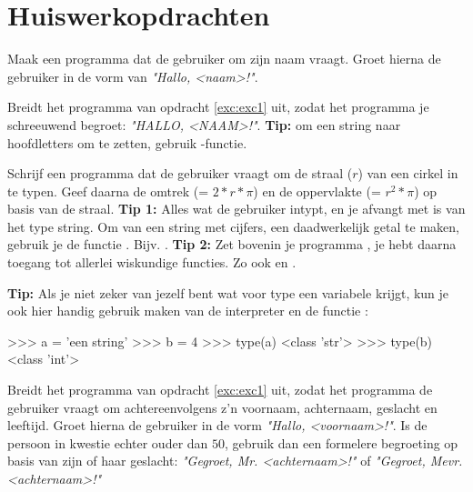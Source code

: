 \section{Huiswerkopdrachten}
\begin{exercise} \label{exc:exc1}
Maak een programma dat de gebruiker om zijn naam vraagt. Groet hierna de gebruiker in de vorm van \textit{"Hallo, <naam>!"}.
\end{exercise}

\begin{exercise}
Breidt het programma van opdracht \ref{exc:exc1} uit, zodat het programma je schreeuwend begroet: \textit{"HALLO, <NAAM>!"}. \newline
\textbf{Tip:} om een string naar hoofdletters om te zetten, gebruik -functie.
\end{exercise}

\begin{exercise}
Schrijf een programma dat de gebruiker vraagt om de straal ($r$) van een cirkel in te typen. Geef daarna de omtrek (= $2*r*\pi$) en de oppervlakte (= $r^2*\pi$) op basis van de straal. \newline \newline
\textbf{Tip 1:} Alles wat de gebruiker intypt, en je afvangt met  is van het type string. Om van een string met cijfers, een daadwerkelijk getal te maken, gebruik je de functie . Bijv. .\newline \newline
\textbf{Tip 2:} Zet bovenin je programma , je hebt daarna toegang tot allerlei wiskundige functies. Zo ook  en .
\end{exercise}

\begin{remark}
\textbf{Tip:} Als je niet zeker van jezelf bent wat voor type een variabele krijgt, kun je ook hier handig gebruik maken van de interpreter en de functie :
\begin{python}
>>> a = 'een string'
>>> b = 4
>>> type(a)
<class 'str'>
>>> type(b)
<class 'int'>
\end{python}
\end{remark}

\begin{exercise}
Breidt het programma van opdracht \ref{exc:exc1} uit, zodat het programma de gebruiker vraagt om achtereenvolgens z'n voornaam, achternaam, geslacht en leeftijd. \newline
Groet hierna de gebruiker in de vorm \textit{"Hallo, <voornaam>!"}. \newline
Is de persoon in kwestie echter ouder dan $50$, gebruik dan een formelere begroeting op basis van zijn of haar geslacht: \textit{"Gegroet, Mr. <achternaam>!"} of \textit{"Gegroet, Mevr. <achternaam>!"}
\end{exercise}

